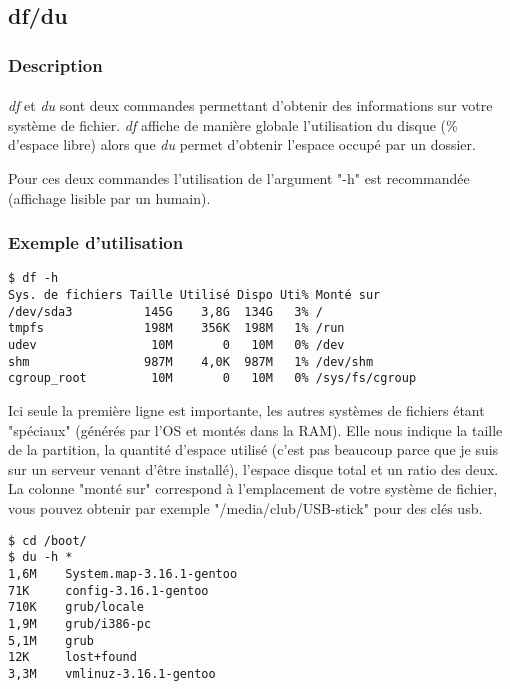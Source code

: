 \subsection*{df/du}
\subsubsection*{Description}

\paragraph{}
\emph{df} et \emph{du} sont deux commandes permettant d'obtenir des
informations sur votre système de fichier.  \emph{df} affiche de manière
globale l'utilisation du disque (\% d'espace libre) alors que \emph{du} permet
d'obtenir l'espace occupé par un dossier.

\noindent Pour ces deux commandes l'utilisation de l'argument "-h" est
recommandée (affichage lisible par un humain).

\subsubsection*{Exemple d'utilisation}

\begin{lstlisting}
$ df -h
Sys. de fichiers Taille Utilisé Dispo Uti% Monté sur
/dev/sda3          145G    3,8G  134G   3% /
tmpfs              198M    356K  198M   1% /run
udev                10M       0   10M   0% /dev
shm                987M    4,0K  987M   1% /dev/shm
cgroup_root         10M       0   10M   0% /sys/fs/cgroup
\end{lstlisting}

Ici seule la première ligne est importante, les autres systèmes de fichiers
étant "spéciaux" (générés par l'OS et montés dans la RAM).  Elle nous indique
la taille de la partition, la quantité d'espace utilisé (c'est pas beaucoup
parce que je suis sur un serveur venant d'être installé), l'espace disque total
et un ratio des deux.  La colonne "monté sur" correspond à l'emplacement de
votre système de fichier, vous pouvez obtenir par exemple
"/media/club/USB-stick" pour des clés usb.

\begin{lstlisting}
$ cd /boot/
$ du -h *
1,6M    System.map-3.16.1-gentoo
71K     config-3.16.1-gentoo
710K    grub/locale
1,9M    grub/i386-pc
5,1M    grub
12K     lost+found
3,3M    vmlinuz-3.16.1-gentoo
\end{lstlisting}
